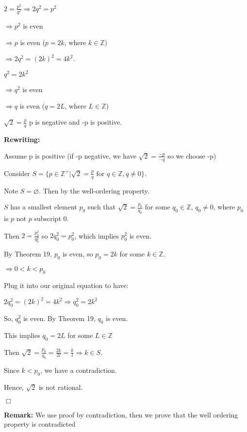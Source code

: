 \documentclass[12 pt]{article}        	%
\begin{document}
$2 = \frac{p^2}{q^2} \Rightarrow 2q^2 = p^2$

$\Rightarrow p^2$ is even

$\Rightarrow p$ is even ($p = 2k$, where $k \in \mathbb{Z}$)

$\Rightarrow 2q^2 = (2k)^2 = 4k^2$.

$q^2 = 2k^2$

$\Rightarrow q^2$ is even

$\Rightarrow q$ is even ($q = 2L$, where $L \in \mathbb{Z}$)

$\sqrt{2} = \frac{p}{q}$ p is negative and -p is positive.

\textbf{Rewriting:}

Assume p is positive (if -p negative, we have $\sqrt{2} = \frac{-p}{-q}$ so we choose -p)

Consider $S = \{ p \in \mathbb{Z}^+ | \sqrt{2} = \frac{p}{q} \text{ for } q \in \mathbb{Z}, q \neq 0 \}$.

Note $S = \varnothing$. Then by the well-ordering property. 

$S$ has a smallest element $p_0$ such that $\sqrt{2} = \frac{p_0}{q_0}$ for some $q_0 \in \mathbb{Z}$, $q_0 \neq 0$, where $p_0$ is $p$ not $p$ subscript $0$.

Then $2 = \frac{p_0^2}{q_0^2}$ so $2q_0^2 = p_0^2$, which implies $p_0^2$ is even.

By Theorem 19, $p_0$ is even, so $p_0 = 2k$ for some $k \in \mathbb{Z}$.

$\Rightarrow 0 < k < p_0$

Plug it into our original equation to have:

$2q_0^2 = (2k)^2 = 4k^2 \Rightarrow q_0^2 = 2k^2$

So, $q_0^2$ is even. By Theorem 19, $q_0$ is even.

This implies $q_0 = 2L$ for some $L \in \mathbb{Z}$

Then $\sqrt{2} = \frac{p_0}{q_0} = \frac{2k}{2l} = \frac{k}{l} \Rightarrow k \in S$.

Since $k < p_0$, we have a contradiction.

Hence, $\sqrt{2}$ is not rational.

$\Box$

\textbf{Remark:} We use proof by contradiction, then we prove that the well ordering property is contradicted
\end{document}
